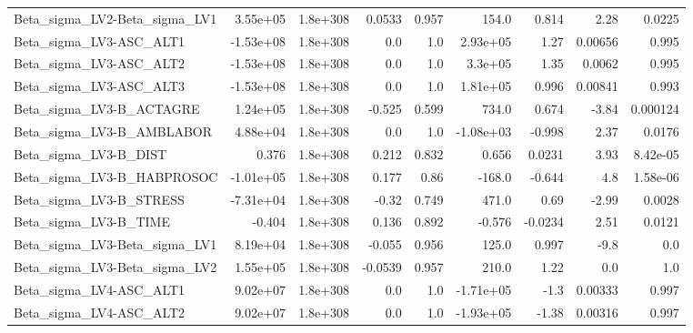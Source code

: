 \begin{tabular}{lrrrrrrrr}
Beta\_sigma\_LV2-Beta\_sigma\_LV1     &    3.55e+05 &     1.8e+308 &  0.0533 &    0.957 &      154.0 &       0.814 &         2.28 &        0.0225 \\
Beta\_sigma\_LV3-ASC\_ALT1           &   -1.53e+08 &     1.8e+308 &     0.0 &      1.0 &   2.93e+05 &        1.27 &      0.00656 &         0.995 \\
Beta\_sigma\_LV3-ASC\_ALT2           &   -1.53e+08 &     1.8e+308 &     0.0 &      1.0 &    3.3e+05 &        1.35 &       0.0062 &         0.995 \\
Beta\_sigma\_LV3-ASC\_ALT3           &   -1.53e+08 &     1.8e+308 &     0.0 &      1.0 &   1.81e+05 &       0.996 &      0.00841 &         0.993 \\
Beta\_sigma\_LV3-B\_ACTAGRE          &    1.24e+05 &     1.8e+308 &  -0.525 &    0.599 &      734.0 &       0.674 &        -3.84 &      0.000124 \\
Beta\_sigma\_LV3-B\_AMBLABOR         &    4.88e+04 &     1.8e+308 &     0.0 &      1.0 &  -1.08e+03 &      -0.998 &         2.37 &        0.0176 \\
Beta\_sigma\_LV3-B\_DIST             &       0.376 &     1.8e+308 &   0.212 &    0.832 &      0.656 &      0.0231 &         3.93 &      8.42e-05 \\
Beta\_sigma\_LV3-B\_HABPROSOC        &   -1.01e+05 &     1.8e+308 &   0.177 &     0.86 &     -168.0 &      -0.644 &          4.8 &      1.58e-06 \\
Beta\_sigma\_LV3-B\_STRESS           &   -7.31e+04 &     1.8e+308 &   -0.32 &    0.749 &      471.0 &        0.69 &        -2.99 &        0.0028 \\
Beta\_sigma\_LV3-B\_TIME             &      -0.404 &     1.8e+308 &   0.136 &    0.892 &     -0.576 &     -0.0234 &         2.51 &        0.0121 \\
Beta\_sigma\_LV3-Beta\_sigma\_LV1     &    8.19e+04 &     1.8e+308 &  -0.055 &    0.956 &      125.0 &       0.997 &         -9.8 &           0.0 \\
Beta\_sigma\_LV3-Beta\_sigma\_LV2     &    1.55e+05 &     1.8e+308 & -0.0539 &    0.957 &      210.0 &        1.22 &          0.0 &           1.0 \\
Beta\_sigma\_LV4-ASC\_ALT1           &    9.02e+07 &     1.8e+308 &     0.0 &      1.0 &  -1.71e+05 &        -1.3 &      0.00333 &         0.997 \\
Beta\_sigma\_LV4-ASC\_ALT2           &    9.02e+07 &     1.8e+308 &     0.0 &      1.0 &  -1.93e+05 &       -1.38 &      0.00316 &         0.997 \\

\end{tabular}
